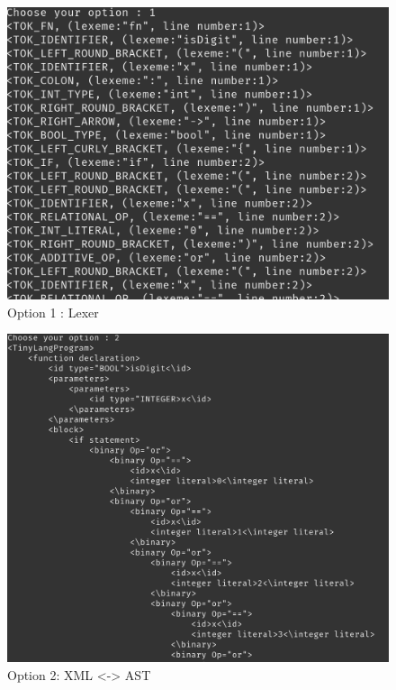 \begin{itemize}
	      \begin{figure}[H]
	      	\centering
	      	\includegraphics[scale=0.5]{Introduction/images/option1menu.png}
	      	\caption{Option 1 : Lexer}
	      	\label{fig:option-one-lexer}
	      \end{figure}
	      	      
	      \begin{figure}[H]
	      	\centering
	      	\includegraphics[scale=0.5]{Introduction/images/option2menu.png}
	      	\caption{Option 2: XML <-> AST}
	      	\label{fig:option-two-lexer}
	      \end{figure}    
	      	        

\end{itemize}
